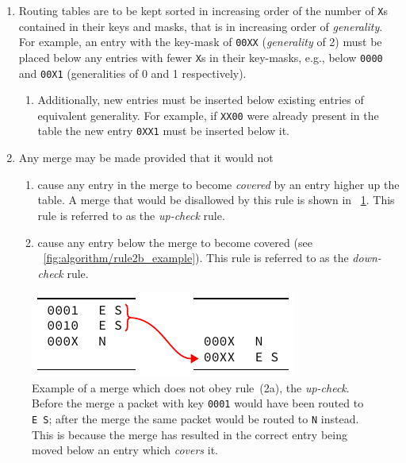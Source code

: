 \documentclass[conference]{IEEEtran}
\newcommand{\mytt}[1]{\texttt{\footnotesize#1}}
\begin{document}
  \begin{enumerate}[\IEEEsetlabelwidth{2)}]
    \item Routing tables are to be kept sorted in increasing order of the number of \mytt{X}s contained in their keys and masks, that is in increasing order of \textit{generality}.
      For example, an entry with the key-mask of \mytt{00XX} (\textit{generality} of 2) must be placed below any entries with fewer \mytt{X}s in their key-masks, e.g., below \mytt{0000} and \mytt{00X1} (generalities of 0 and 1 respectively).
      \begin{enumerate}[\IEEEsetlabelwidth{a)}]
        \item Additionally, new entries must be inserted below existing entries of equivalent generality.
              For example, if \mytt{XX00} were already present in the table the new entry \mytt{0XX1} must be inserted below it.
      \end{enumerate}
    \item Any merge may be made provided that it would not
      \begin{enumerate}[\IEEEsetlabelwidth{b)}]
        \item cause any entry in the merge to become \textit{covered} by an entry higher up the table.
              A merge that would be disallowed by this rule is shown in \figurename~\ref{fig:algorithm/rule2a_example}.
              This rule is referred to as the \textit{up-check} rule.
        \item cause any entry below the merge to become covered (see \figurename~\ref{fig:algorithm/rule2b_example}).
              This rule is referred to as the \textit{down-check} rule.
      \end{enumerate}
  \end{enumerate}

  \begin{figure}
    \centering
    \includegraphics{figures/rule2a_example}
    \caption{
      Example of a merge which does not obey rule~(2a), the \textit{up-check}.
      Before the merge a packet with key \mytt{0001} would have been routed to \mytt{E~S}; after the merge the same packet would be routed to \mytt{N} instead.
      This is because the merge has resulted in the correct entry being moved below an entry which \textit{covers} it.
    }
    \label{fig:algorithm/rule2a_example}
  \end{figure}
\end{document}
